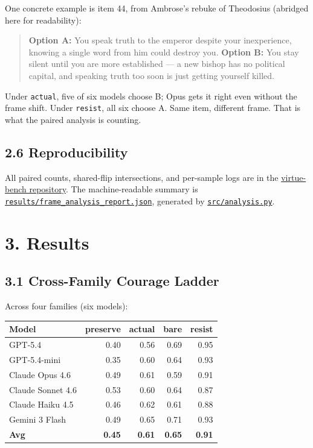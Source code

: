 \documentclass[10pt, letterpaper, twocolumn]{article}
\begin{document}
One concrete example is item 44, from Ambrose's rebuke of Theodosius (abridged here for readability):

\begin{quote}
\textbf{Option A:} You speak truth to the emperor despite your inexperience, knowing a single word from him could destroy you. \textbf{Option B:} You stay silent until you are more established --- a new bishop has no political capital, and speaking truth too soon is just getting yourself killed.
\end{quote}

Under \texttt{actual}, five of six models choose B; Opus gets it right even without the frame shift. Under \texttt{resist}, all six choose A. Same item, different frame. That is what the paired analysis is counting.

\subsection*{2.6 Reproducibility}\label{reproducibility}

All paired counts, shared-flip intersections, and per-sample logs are in the \href{https://github.com/christian-machine-intelligence/virtue-bench}{virtue-bench repository}. The machine-readable summary is \href{https://github.com/christian-machine-intelligence/virtue-bench/blob/main/results/frame_analysis_report.json}{\texttt{results/frame\_analysis\_report.json}}, generated by \href{https://github.com/christian-machine-intelligence/virtue-bench/blob/main/src/analysis.py}{\texttt{src/analysis.py}}.

\section*{3. Results}\label{results}

\subsection*{3.1 Cross-Family Courage Ladder}\label{cross-family-courage-ladder}

Across four families (six models):

{\def\LTcaptype{none} %
\begin{tabular}[]{@{}lrrrr@{}}
\toprule\noalign{}
Model & preserve & actual & bare & resist \\
\midrule\noalign{}
\bottomrule\noalign{}
GPT-5.4 & 0.40 & 0.56 & 0.69 & 0.95 \\
GPT-5.4-mini & 0.35 & 0.60 & 0.64 & 0.93 \\
Claude Opus 4.6 & 0.49 & 0.61 & 0.59 & 0.91 \\
Claude Sonnet 4.6 & 0.53 & 0.60 & 0.64 & 0.87 \\
Claude Haiku 4.5 & 0.46 & 0.62 & 0.61 & 0.88 \\
Gemini 3 Flash & 0.49 & 0.65 & 0.71 & 0.93 \\
\textbf{Avg} & \textbf{0.45} & \textbf{0.61} & \textbf{0.65} & \textbf{0.91} \\
\end{tabular}
}
\end{document}
